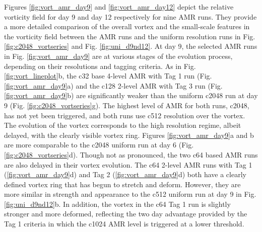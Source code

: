 Figures \ref{fig:vort_amr_day9} and \ref{fig:vort_amr_day12} depict the relative 
vorticity field for day 9 and day 12 respectively for nine AMR runs. They provide 
a more detailed comparison of the overall vortex and the small-scale features in the 
vorticity field between the AMR runs and the uniform resolution runs in 
Fig. \ref{fig:c2048_vortseries} and Fig. \ref{fig:uni_d9nd12}. At day 9, the selected
AMR runs in Fig. \ref{fig:vort_amr_day9} are at various stages of the 
evolution process, depending on their resolutions and tagging criteria. As in 
Fig. \ref{fig:vort_lineplot}b, the c32 base 4-level AMR with Tag 1 run (Fig. 
\ref{fig:vort_amr_day9}a) and the c128 2-level AMR with Tag 3 run (Fig.
\ref{fig:vort_amr_day9}b) are significantly weaker than the uniform c2048 run
at day 9 (Fig. \ref{fig:c2048_vortseries}g). The highest level of AMR for both runs, c2048,
has not yet been triggered, and both runs use c512 resolution over the vortex.
 The evolution of the vortex corresponds to the high resolution regime, albeit delayed, with the clearly visible
 vortex ring. Figures \ref{fig:vort_amr_day9}a and b are more comparable to
the c2048 uniform run at day 6 (Fig. \ref{fig:c2048_vortseries}d). Though not as pronounced,
the two c64 based AMR runs are also delayed in their vortex evolution. The c64 2-level AMR runs
with Tag 1 (\ref{fig:vort_amr_day9}d) and Tag 2  (\ref{fig:vort_amr_day9}d) both have a clearly
defined vortex ring that has begun to stretch and deform. However, they are more similar 
in strength and appearance to the c512 uniform run at day 9 in Fig. \ref{fig:uni_d9nd12}b. 
In addition, the vortex in the c64 Tag 1 run is slightly stronger and more deformed, reflecting the
two day advantage provided by the Tag 1 criteria in which the c1024 AMR level is triggered at a lower threshold.

